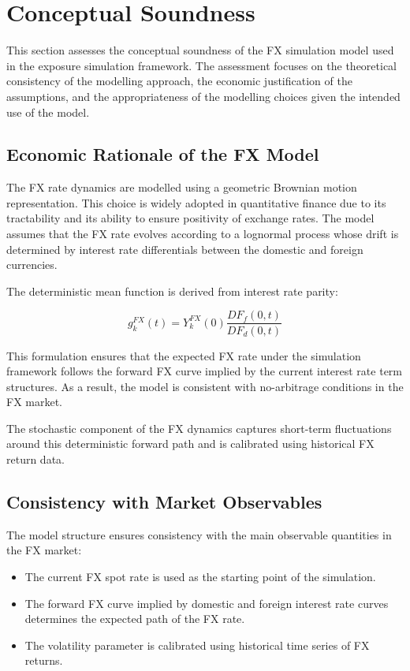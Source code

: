 \section{Conceptual Soundness}\label{ConceptualSoundness}
 

This section assesses the conceptual soundness of the FX simulation model used in the exposure simulation framework. The assessment focuses on the theoretical consistency of the modelling approach, the economic justification of the assumptions, and the appropriateness of the modelling choices given the intended use of the model.

\subsection{Economic Rationale of the FX Model}

The FX rate dynamics are modelled using a geometric Brownian motion representation. This choice is widely adopted in quantitative finance due to its tractability and its ability to ensure positivity of exchange rates. The model assumes that the FX rate evolves according to a lognormal process whose drift is determined by interest rate differentials between the domestic and foreign currencies.

The deterministic mean function is derived from interest rate parity:

\begin{equation}
	g_k^{FX}(t) = Y_k^{FX}(0)\frac{DF_f(0,t)}{DF_d(0,t)}
\end{equation}

This formulation ensures that the expected FX rate under the simulation framework follows the forward FX curve implied by the current interest rate term structures. As a result, the model is consistent with no-arbitrage conditions in the FX market.

The stochastic component of the FX dynamics captures short-term fluctuations around this deterministic forward path and is calibrated using historical FX return data.

\subsection{Consistency with Market Observables}

The model structure ensures consistency with the main observable quantities in the FX market:

\begin{itemize}
	
	\item The current FX spot rate is used as the starting point of the simulation.
	
	\item The forward FX curve implied by domestic and foreign interest rate curves determines the expected path of the FX rate.
	
	\item The volatility parameter is calibrated using historical time series of FX returns.
	
\end{itemize}

